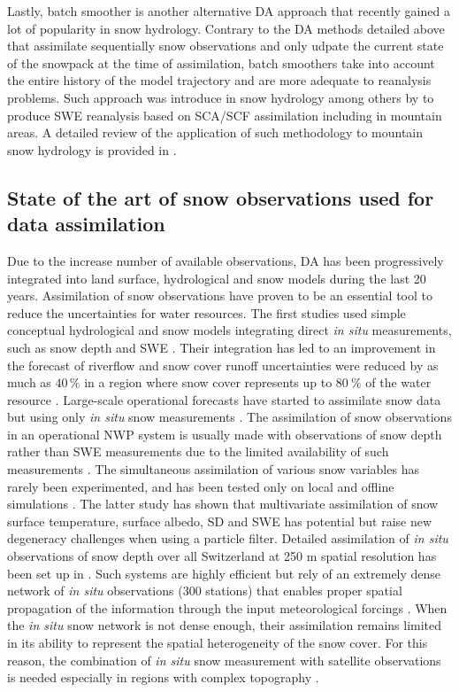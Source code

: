 \documentclass[utf8]{frontiersSCNS} %
\begin{document}

Lastly, batch smoother is another alternative DA approach that recently gained a lot of popularity in snow hydrology. Contrary to the DA methods detailed above that assimilate sequentially snow observations and only udpate the current state of the snowpack at the time of assimilation, batch smoothers take into account the entire history of the model trajectory and are more adequate to reanalysis problems. Such approach was introduce in snow hydrology among others by \citet{Margulis_2015} to produce SWE reanalysis based on SCA/SCF assimilation including in mountain areas. A detailed review of the application of such methodology to mountain snow hydrology is provided in \citet{Aalstad_2018}. 



\subsection{State of the art of snow observations used for data assimilation}

Due to the increase number of available observations, DA has been progressively integrated into land surface, hydrological and snow models during the last 20 years. Assimilation of snow observations have proven to be an essential tool to reduce the uncertainties for water resources. The first studies used simple conceptual hydrological and snow models integrating direct \textit{in situ} measurements, such as snow depth and SWE \citep{Day_1990, Carroll_1978}. Their integration has led to an improvement in the forecast of riverflow \citep{Day_1990} and snow cover runoff uncertainties were reduced by as much as  $40\,\%$ in a region where snow cover represents up to $80 \ \%$ of the water resource \citep{Carroll_1978}. Large-scale operational forecasts have started to assimilate snow data but using only \textit{in situ} snow measurements \citep{Brasnett_1999}. The assimilation of snow observations in an operational NWP system is usually made with observations of snow depth rather than SWE measurements due to the limited availability of such measurements \citep{Essery_2013}. The simultaneous assimilation of various snow variables has rarely been experimented, and has been tested only on local and offline simulations \citep{Piazzi_2018}. The latter study has shown that multivariate assimilation of snow surface temperature, surface albedo, SD and SWE has potential but raise new degeneracy challenges when using a particle filter. Detailed assimilation of \textit{in situ} observations of snow depth over all Switzerland at 250 m spatial resolution has been set up in \citet{Winstral_2019}. Such systems are highly efficient but rely of an extremely dense network of  \textit{in situ} observations (300 stations) that enables proper spatial propagation of the information through the input meteorological forcings \citep{Winstral_2019}. When the \textit{in situ} snow network is not dense enough, their assimilation remains limited in its ability to represent the spatial heterogeneity of the snow cover. For this reason, the combination of \textit{in situ} snow measurement with satellite observations is needed especially in regions with complex topography \citep{Magnusson_2015}. 
\end{document}
